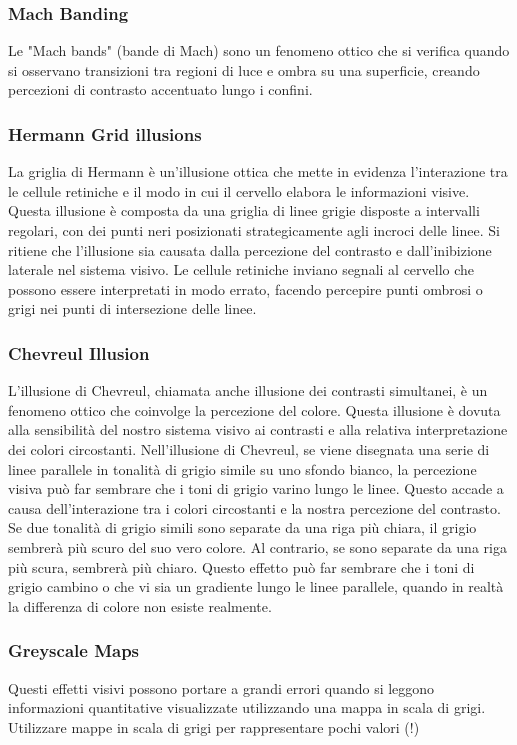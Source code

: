 \subsubsection{Mach Banding}
Le "Mach bands" (bande di Mach) sono un fenomeno ottico che si verifica quando si osservano transizioni tra regioni di luce e ombra su una superficie, creando 
percezioni di contrasto accentuato lungo i confini.
\subsubsection{Hermann Grid illusions}

La griglia di Hermann è un'illusione ottica che mette in evidenza l'interazione tra le cellule retiniche e il modo in cui il cervello elabora le informazioni visive. Questa illusione è composta da una griglia di linee grigie disposte a intervalli regolari, 
con dei punti neri posizionati strategicamente agli incroci delle linee.
Si ritiene che l'illusione sia causata dalla percezione del contrasto e dall'inibizione laterale nel sistema visivo. Le cellule retiniche inviano segnali al cervello che possono essere interpretati in modo errato, 
facendo percepire punti ombrosi o grigi nei punti di intersezione delle linee.
\subsubsection{Chevreul Illusion}

L'illusione di Chevreul, chiamata anche illusione dei contrasti simultanei, è un fenomeno ottico che coinvolge la percezione del colore. Questa illusione è dovuta alla sensibilità del nostro sistema visivo ai contrasti e alla relativa interpretazione dei colori circostanti.
Nell'illusione di Chevreul, se viene disegnata una serie di linee parallele in tonalità di grigio simile su uno sfondo bianco, la percezione visiva può far sembrare che i toni di grigio varino lungo le linee. Questo accade a causa dell'interazione tra i colori circostanti e la nostra percezione del contrasto.
Se due tonalità di grigio simili sono separate da una riga più chiara, il grigio sembrerà più scuro del suo vero colore. Al contrario, se sono separate da una riga più scura, sembrerà più chiaro. Questo effetto può far sembrare che i toni di grigio cambino o che vi sia un gradiente lungo le linee parallele,
 quando in realtà la differenza di colore non esiste realmente.
 \subsubsection{Greyscale Maps}
Questi effetti visivi possono portare a grandi errori quando si leggono informazioni quantitative visualizzate utilizzando una mappa in scala di grigi.
Utilizzare mappe in scala di grigi per rappresentare pochi valori (!)
